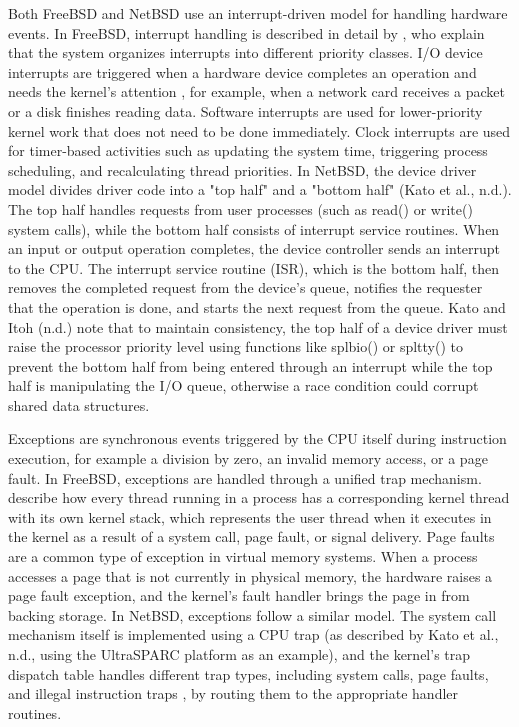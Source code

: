 Both FreeBSD and NetBSD use an interrupt-driven model for handling hardware events. In FreeBSD, interrupt handling is described in detail by \textcite{watson2015}, who explain that the system organizes interrupts into different priority classes. I/O device interrupts are triggered when a hardware device completes an operation and needs the kernel's attention , for example, when a network card receives a packet or a disk finishes reading data. Software interrupts are used for lower-priority kernel work that does not need to be done immediately. Clock interrupts are used for timer-based activities such as updating the system time, triggering process scheduling, and recalculating thread priorities.
In NetBSD, the device driver model divides driver code into a "top half" and a "bottom half" (Kato et al., n.d.). The top half handles requests from user processes (such as read() or write() system calls), while the bottom half consists of interrupt service routines. When an input or output operation completes, the device controller sends an interrupt to the CPU. The interrupt service routine (ISR), which is the bottom half, then removes the completed request from the device's queue, notifies the requester that the operation is done, and starts the next request from the queue. Kato and Itoh (n.d.) note that to maintain consistency, the top half of a device driver must raise the processor priority level using functions like splbio() or spltty() to prevent the bottom half from being entered through an interrupt while the top half is manipulating the I/O queue, otherwise a race condition could corrupt shared data structures.

Exceptions are synchronous events triggered by the CPU itself during instruction execution, for example a division by zero, an invalid memory access, or a page fault. In FreeBSD, exceptions are handled through a unified trap mechanism. \textcite{watson2015} describe how every thread running in a process has a corresponding kernel thread with its own kernel stack, which represents the user thread when it executes in the kernel as a result of a system call, page fault, or signal delivery. Page faults are a common type of exception in virtual memory systems. When a process accesses a page that is not currently in physical memory, the hardware raises a page fault exception, and the kernel's fault handler brings the page in from backing storage.
In NetBSD, exceptions follow a similar model. The system call mechanism itself is implemented using a CPU trap (as described by Kato et al., n.d., using the UltraSPARC platform as an example), and the kernel's trap dispatch table handles different trap types, including system calls, page faults, and illegal instruction traps , by routing them to the appropriate handler routines.

